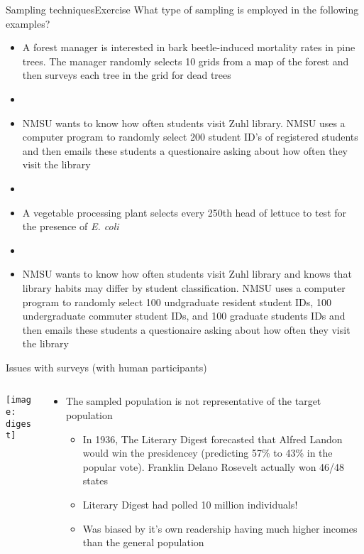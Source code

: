 \documentclass[xcolor=dvipsnames]{beamer}
\begin{document}
\begin{frame}{Sampling techniques}{Exercise}
What type of sampling is employed in the following examples?

{\scriptsize
	\begin{itemize}
		\item A forest manager is interested in bark beetle-induced mortality rates in pine trees. The manager randomly selects 10 grids from a map of the forest and then surveys each tree in the grid for dead trees
		\item[]
		\item NMSU wants to know how often students visit Zuhl library. NMSU uses a computer program to randomly select 200 student ID's of registered students and then emails these students a questionaire asking about how often they visit the library
		\item[]
		\item A vegetable processing plant selects every 250th head of lettuce to test for the presence of \emph{E. coli}
		\item[]
		\item NMSU wants to know how often students visit Zuhl library and knows that library habits may differ by student classification. NMSU uses a computer program to randomly select 100 undgraduate resident student IDs, 100 undergraduate commuter student IDs, and 100 graduate students IDs and then emails these students a questionaire asking about how often they visit the library

	\end{itemize}
}
\end{frame}

\begin{frame}{Issues with surveys (with human participants)}
	\begin{columns}
		\begin{column}{.4 \textwidth}
			\texttt{[image: digest]}
		\end{column}
		\begin{column}{.55 \textwidth}
			\begin{itemize}
				\item The sampled population is not representative of the target population
				
				\begin{itemize}
					\item In 1936, The Literary Digest forecasted that Alfred Landon would win the presidencey (predicting 57\% to 43\% in the popular vote). Franklin Delano Rosevelt actually won 46/48 states
					\item Literary Digest had polled 10 million individuals!
					\item Was biased by it's own readership having much higher incomes than the general population
				\end{itemize}
			\end{itemize}

		\end{column}
	\end{columns}
		
\end{frame}
\end{document}
